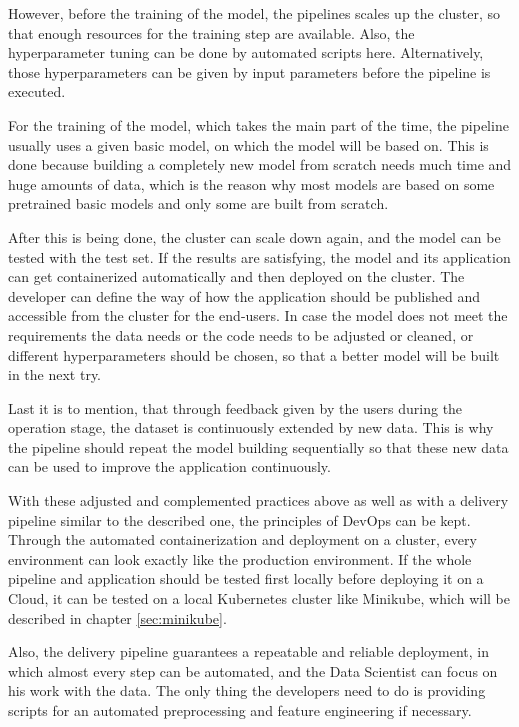 \documentclass[12pt,english,a4paper,oneside,,tablecaptionabove]{scrbook}
\begin{document}
However, before the training of the model, the pipelines scales up the
cluster, so that enough resources for the training step are available.
Also, the hyperparameter tuning can be done by automated scripts here.
Alternatively, those hyperparameters can be given by input parameters
before the pipeline is executed.

For the training of the model, which takes the main part of the time,
the pipeline usually uses a given basic model, on which the model will
be based on. This is done because building a completely new model from
scratch needs much time and huge amounts of data, which is the reason
why most models are based on some pretrained basic models and only some
are built from scratch.

After this is being done, the cluster can scale down again, and the
model can be tested with the test set. If the results are satisfying,
the model and its application can get containerized automatically and
then deployed on the cluster. The developer can define the way of how
the application should be published and accessible from the cluster for
the end-users. In case the model does not meet the requirements the data
needs or the code needs to be adjusted or cleaned, or different
hyperparameters should be chosen, so that a better model will be built
in the next try.

Last it is to mention, that through feedback given by the users during
the operation stage, the dataset is continuously extended by new data.
This is why the pipeline should repeat the model building sequentially
so that these new data can be used to improve the application
continuously.

With these adjusted and complemented practices above as well as with a
delivery pipeline similar to the described one, the principles of DevOps
can be kept. Through the automated containerization and deployment on a
cluster, every environment can look exactly like the production
environment. If the whole pipeline and application should be tested
first locally before deploying it on a Cloud, it can be tested on a
local Kubernetes cluster like Minikube, which will be described in
chapter \ref{sec:minikube}.

Also, the delivery pipeline guarantees a repeatable and reliable
deployment, in which almost every step can be automated, and the Data
Scientist can focus on his work with the data. The only thing the
developers need to do is providing scripts for an automated
preprocessing and feature engineering if necessary.
\end{document}
